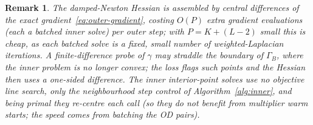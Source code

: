 \documentclass[12pt]{article}
\newtheorem{remark}{Remark}
\begin{document}
\begin{remark}
    The damped-Newton Hessian is assembled by central differences of the exact
    gradient~\eqref{eq:outer-gradient}, costing $O(P)$ extra gradient evaluations
    (each a batched inner solve) per outer step; with $P = K + (L-2)$ small this is
    cheap, as each batched solve is a fixed, small number of weighted-Laplacian
    iterations. A finite-difference probe of $\gamma$ may straddle the boundary of
    $\Gamma_B$, where the inner problem is no longer convex; the loss flags such
    points and the Hessian then uses a one-sided difference. The inner
    interior-point solves use no objective line search, only the neighbourhood step
    control of Algorithm~\ref{alg:inner}, and being primal they re-centre each call
    (so they do not benefit from multiplier warm starts; the speed comes from
    batching the OD pairs).
\end{remark}



\end{document}
